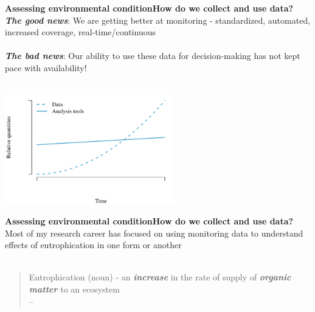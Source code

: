 \documentclass[serif]{beamer}\usepackage[]{graphicx}\usepackage[]{color}
\newcommand{\emtxt}[1]{\textbf{\textit{#1}}}
\begin{document}
\begin{frame}{\textbf{Assessing environmental condition}}{\textbf{How do we collect and use data?}}
\onslide<+->
\emtxt{The good news}: We are getting better at monitoring - standardized, automated, increased coverage, real-time/continuous \\~\\
\emtxt{The bad news}: Our ability to use these data for decision-making has not kept pace with availability! \\~\\
\onslide<+->


{\centering \includegraphics[width=0.55\textwidth]{fig/theo-1} 

}



\end{frame}

\begin{frame}{\textbf{Assessing environmental condition}}{\textbf{How do we collect and use data?}}
Most of my research career has focused on using monitoring data to understand effects of eutrophication in one form or another \\~\\
\onslide<+->
\begin{quote}
Eutrophication (noun) - an \emtxt{increase} in the rate of supply of \emtxt{organic matter} to an ecosystem\\
\hfill -- \cite{Nixon95}
\end{quote}
\begin{center}
\end{center}
\vspace{-0.5cm}\hspace*{15pt}\\~\\
\end{frame}
\end{document}
